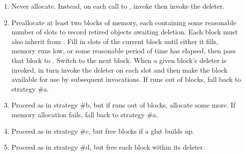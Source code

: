 \begin{enumerate}
	\begin{enumerate}
	\item	Never allocate.
		Instead, on each call to , invoke
		 then invoke the deleter.
	\item	Preallocate at least two blocks of memory, each containing
		some reasonable number of slots to record retired objects
		awaiting deletion.
		Each block must also inherit from .
		Fill in slots of the current block until either it fills,
		memory runs low, or some reasonable period of time has
		elapsed, then pass that block to .
		Switch to the next block.
		When a given block's deleter is invoked, in turn invoke
		the deleter on each slot and then make the block available
		for use by subsequent  invocations.
		If  runs out of blocks, fall back
		to strategy \#a.
	\item	Proceed as in strategy \#b, but if 
		runs out of blocks, allocate some more.
		If memory allocation fails, fall back to strategy \#a.
	\item	Proceed as in strategy \#c, but free blocks if a glut
		builds up.
	\item	Proceed as in strategy \#d, but free each block within
		its deleter.
	\end{enumerate}


\end{enumerate}
